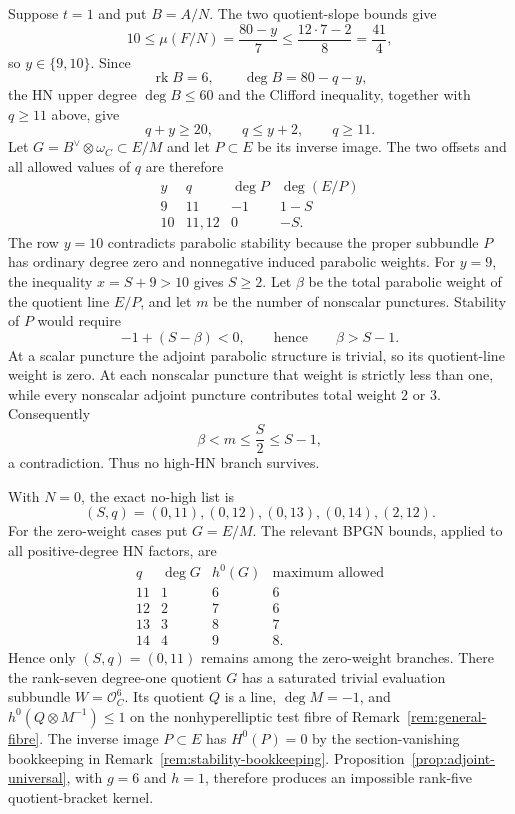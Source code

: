 \documentclass[11pt]{article}
\theoremstyle{definition}
\newcommand{\Ocal}{\mathcal O}
\newcommand{\rk}{\operatorname{rk}}
\begin{document}
Suppose $t=1$ and put $B=A/N$.  The two quotient-slope bounds give
\[
 10\le\mu(F/N)=\frac{80-y}{7}
 \le\frac{12\cdot7-2}{8}=\frac{41}{4},
\]
so $y\in\{9,10\}$.  Since
\[
 \rk B=6,
 \qquad \deg B=80-q-y,
\]
the HN upper degree $\deg B\le60$ and the Clifford inequality, together with
$q\ge11$ above, give
\[
 q+y\ge20,
 \qquad q\le y+2,
 \qquad q\ge11.
\]
Let $G=B^\vee\otimes\omega_C\subset E/M$ and let $P\subset E$ be its
inverse image.  The two offsets and all allowed values of $q$ are therefore
\[
\begin{array}{c|c|c|c}
y& q&\deg P&\deg(E/P)\\ \hline
9&11&-1&1-S\\
10&11,12&0&-S.
\end{array}
\]
The row $y=10$ contradicts parabolic stability because the proper subbundle
$P$ has ordinary degree zero and nonnegative induced parabolic weights.
For $y=9$, the inequality $x=S+9>10$ gives $S\ge2$.  Let $\beta$ be the
total parabolic weight of the quotient line $E/P$, and let $m$ be the number
of nonscalar punctures.  Stability of $P$ would require
\[
 -1+(S-\beta)<0,
 \qquad\text{hence}\qquad \beta>S-1.
\]
At a scalar puncture the adjoint parabolic structure is trivial, so its
quotient-line weight is zero.  At each nonscalar puncture that weight is
strictly less than one, while every nonscalar adjoint puncture contributes
total weight $2$ or $3$.  Consequently
\[
 \beta<m\le\frac S2\le S-1,
\]
a contradiction.  Thus no high-HN branch survives.

With $N=0$, the exact no-high list is
\[
 (S,q)=(0,11),(0,12),(0,13),(0,14),(2,12).
\]
For the zero-weight cases put $G=E/M$.  The relevant BPGN bounds, applied to all
positive-degree HN factors, are
\[
\begin{array}{c|c|c|c}
q&\deg G&h^0(G)&\text{maximum allowed}\\ \hline
11&1&6&6\\
12&2&7&6\\
13&3&8&7\\
14&4&9&8.
\end{array}
\]
Hence only $(S,q)=(0,11)$ remains among the zero-weight branches.  There the
rank-seven degree-one quotient $G$ has a saturated trivial evaluation
subbundle $W=\Ocal_C^6$.  Its quotient $Q$ is a line, $\deg M=-1$, and
$h^0(Q\otimes M^{-1})\le1$ on the nonhyperelliptic test fibre of
Remark~\ref{rem:general-fibre}.  The inverse image $P\subset E$ has $H^0(P)=0$
by the section-vanishing bookkeeping in Remark~\ref{rem:stability-bookkeeping}.
Proposition~\ref{prop:adjoint-universal},
with $g=6$ and $h=1$, therefore produces an impossible rank-five
quotient-bracket kernel.
\end{document}
